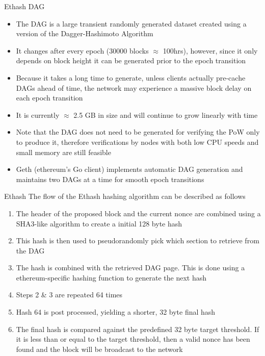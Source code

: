 \documentclass[11pt]{beamer}
\begin{document}

\begin{frame}{Ethash DAG}
	\begin{itemize}
		\item The DAG is a large transient randomly generated dataset created using a version of the Dagger-Hashimoto Algorithm
		\item It changes after every epoch (30000 blocks $\approx$ 100hrs), however, since it only depends on block height it can be generated prior to the epoch transition
		\item Because it takes a long time to generate, unless clients actually pre-cache DAGs ahead of time, the network may experience a massive block delay on each epoch transition
		\item It is currently $\approx$ 2.5 GB in size and will continue to grow linearly with time
		\item Note that the DAG does not need to be generated for verifying the PoW only to produce it, therefore verifications by nodes with both low CPU speeds and small memory are still feasible
		\item Geth (ethereum's Go client) implements automatic DAG generation and maintains two DAGs at a time for smooth epoch transitions
	\end{itemize}
\end{frame}


\begin{frame}{Ethash}
	The flow of the Ethash hashing algorithm can be described as follows
	\begin{enumerate}
		\item The header of the proposed block and the current nonce  are combined using a SHA3-like algorithm to create a initial 128 byte hash
		\item This hash is then used to pseudorandomly pick which section to retrieve from the DAG
		\item The hash is combined with the retrieved DAG page. This is done using a ethereum-specific hashing function to generate the next hash
		\item Steps 2 \& 3 are repeated 64 times
		\item Hash 64 is post processed, yielding a shorter, 32 byte final hash
		\item The final hash is compared against the predefined 32 byte target threshold. If it is less than or equal to the target threshold, then a valid nonce has been found and the block will be broadcast to the network
	\end{enumerate}
\end{frame}
\end{document}
